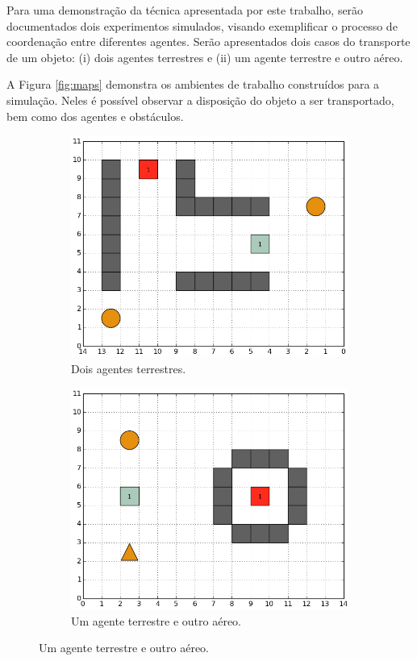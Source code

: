 Para uma demonstração da técnica apresentada por este trabalho, serão documentados dois experimentos simulados, visando exemplificar o processo de coordenação entre diferentes agentes. Serão apresentados dois casos do transporte de um objeto: (i) dois agentes terrestres e (ii) um agente terrestre e outro aéreo.

A Figura \ref{fig:maps} demonstra os ambientes de trabalho construídos para a simulação. Neles é possível observar a disposição do objeto a ser transportado, bem como dos agentes e obstáculos.

\begin{figure}[h]
  \centering
  \setlength{\fboxsep}{0pt}

  \begin{subfigure}[t]{0.45\textwidth}
    \centering
    \includegraphics[width=\textwidth]{img/experimentos/sim_map1.png}
    \caption{Dois agentes terrestres.}
  \end{subfigure}
  \hspace{0.2cm}
  \begin{subfigure}[t]{0.45\textwidth}
    \centering
    \includegraphics[width=\textwidth]{img/experimentos/sim_map2.png}
    \caption{Um agente terrestre e outro aéreo.}
  \end{subfigure}


\end{figure}
